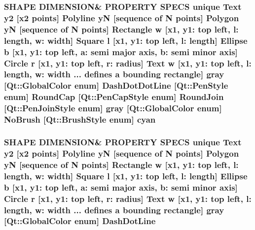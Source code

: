 \subsubsection[{\texorpdfstring{cyan}{cyan}}]{\setlength{\rightskip}{0pt plus 5cm}S\+H\+A\+PE D\+I\+M\+E\+N\+S\+I\+ON\& P\+R\+O\+P\+E\+R\+TY S\+P\+E\+CS unique {\bf Text} {\bf y2} \mbox{[}{\bf x2} points\mbox{]} {\bf Polyline} yN \mbox{[}sequence of N points\mbox{]} {\bf Polygon} yN \mbox{[}sequence of N points\mbox{]} {\bf Rectangle} w \mbox{[}{\bf x1}, y1\+: top left, l\+: length, w\+: width\mbox{]} {\bf Square} {\bf l} \mbox{[}{\bf x1}, y1\+: top left, l\+: length\mbox{]} {\bf Ellipse} b \mbox{[}{\bf x1}, y1\+: top left, a\+: semi major axis, b\+: semi minor axis\mbox{]} {\bf Circle} r \mbox{[}{\bf x1}, y1\+: top left, r\+: radius\mbox{]} {\bf Text} w \mbox{[}{\bf x1}, y1\+: top left, l\+: length, w\+: width ... defines {\bf a} bounding rectangle\mbox{]} gray \mbox{[}Qt\+::\+Global\+Color enum\mbox{]} Dash\+Dot\+Dot\+Line \mbox{[}Qt\+::\+Pen\+Style enum\mbox{]} Round\+Cap \mbox{[}{\bf Qt\+::\+Pen\+Cap\+Style} enum\mbox{]} Round\+Join \mbox{[}{\bf Qt\+::\+Pen\+Join\+Style} enum\mbox{]} gray \mbox{[}Qt\+::\+Global\+Color enum\mbox{]} No\+Brush \mbox{[}{\bf Qt\+::\+Brush\+Style} enum\mbox{]} cyan}\hypertarget{shape__input__file__specs_8txt_a35e09d3e179c027a035bde31a31b4496}{}\label{shape__input__file__specs_8txt_a35e09d3e179c027a035bde31a31b4496}
\subsubsection[{\texorpdfstring{Dash\+Dot\+Line}{DashDotLine}}]{\setlength{\rightskip}{0pt plus 5cm}S\+H\+A\+PE D\+I\+M\+E\+N\+S\+I\+ON\& P\+R\+O\+P\+E\+R\+TY S\+P\+E\+CS unique {\bf Text} {\bf y2} \mbox{[}{\bf x2} points\mbox{]} {\bf Polyline} yN \mbox{[}sequence of N points\mbox{]} {\bf Polygon} yN \mbox{[}sequence of N points\mbox{]} {\bf Rectangle} w \mbox{[}{\bf x1}, y1\+: top left, l\+: length, w\+: width\mbox{]} {\bf Square} {\bf l} \mbox{[}{\bf x1}, y1\+: top left, l\+: length\mbox{]} {\bf Ellipse} b \mbox{[}{\bf x1}, y1\+: top left, a\+: semi major axis, b\+: semi minor axis\mbox{]} {\bf Circle} r \mbox{[}{\bf x1}, y1\+: top left, r\+: radius\mbox{]} {\bf Text} w \mbox{[}{\bf x1}, y1\+: top left, l\+: length, w\+: width ... defines {\bf a} bounding rectangle\mbox{]} gray \mbox{[}Qt\+::\+Global\+Color enum\mbox{]} Dash\+Dot\+Line}\hypertarget{shape__input__file__specs_8txt_a9d5081cd9ba835c8db9fdedf4c8ee19a}{}\label{shape__input__file__specs_8txt_a9d5081cd9ba835c8db9fdedf4c8ee19a}
